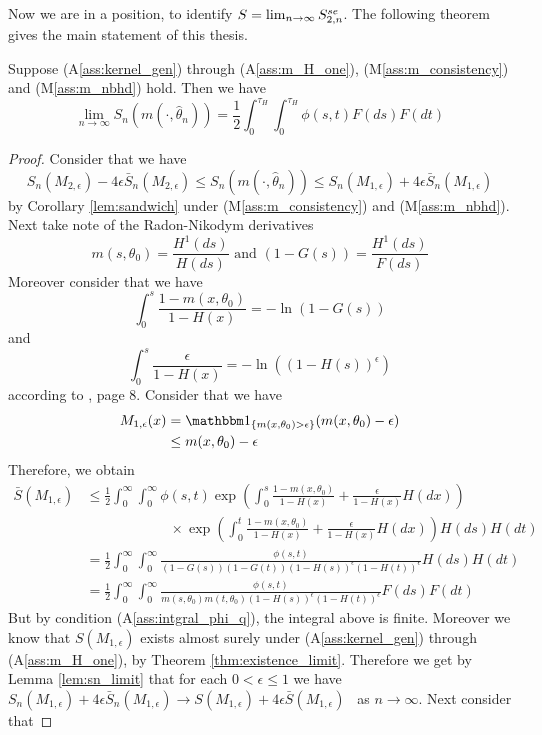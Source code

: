 Now we are in a position, to identify $S = \lim_{n\to\infty} S_{2,n}^{se}$. The following theorem gives the main statement of this thesis.
\begin{thm}
	Suppose (A\ref{ass:kernel_gen}) through (A\ref{ass:m_H_one}), (M\ref{ass:m_consistency}) and (M\ref{ass:m_nbhd}) hold. Then we have
	$$\lim\limits_{n\to\infty} S_n(m(\cdot, \hat{\theta}_n)) = \frac{1}{2}\int_{0}^{\tau_H}\int_{0}^{\tau_H} \phi(s,t) F(ds)F(dt)$$
	\label{thm:snmn_limit}
	\begin{proof}
		Consider that we have
		$$S_n(M_{2,\epsilon}) - 4\epsilon \bar{S}_n(M_{2,\epsilon}) \leq S_n(m(\cdot, \hat\theta_n)) \leq S_n(M_{1,\epsilon}) + 4\epsilon \bar{S}_n(M_{1,\epsilon})$$
		by Corollary \ref{lem:sandwich} under (M\ref{ass:m_consistency}) and (M\ref{ass:m_nbhd}). Next take note of the Radon-Nikodym derivatives 
		$$m(s,\theta_0) = \frac{H^1(ds)}{H(ds)} \textrm{ and } (1-G(s)) = \frac{H^1(ds)}{F(ds)}$$
		Moreover consider that we have
		$$\int_{0}^{s} \frac{1-m(x,\theta_0)}{1-H(x)} = -\ln(1-G(s))$$
		and 
		$$\int_{0}^{s} \frac{\epsilon}{1-H(x)} = -\ln((1-H(s))^\epsilon)$$
		according to \cite{dikta2000strong}, page 8.
		Consider that we have 
		\begin{align*}
			M_{1,\epsilon}(x) &= \I{ m(x,\theta_0)>\epsilon}(m(x,\theta_0)-\epsilon)\\
			&\leq m(x,\theta_0)-\epsilon
		\end{align*}
		Therefore, we obtain
		\begin{align*}
			\bar{S}(M_{1,\epsilon}) &\leq \frac{1}{2}\int_{0}^{\infty} \int_{0}^{\infty} \phi(s,t)  \exp\left(\int_{0}^{s} \frac{1-m(x,\theta_0)}{1-H(x)} + \frac{\epsilon}{1-H(x)} H(dx)\right)\\
			&\qquad\qquad\qquad \times \exp\left(\int_{0}^{t} \frac{1-m(x,\theta_0)}{1-H(x)} + \frac{\epsilon}{1-H(x)} H(dx) \right)H(ds)H(dt)\\
			&= \frac{1}{2}\int_{0}^{\infty} \int_{0}^{\infty} \frac{\phi(s,t)}{(1-G(s))(1-G(t))(1-H(s))^\epsilon(1-H(t))^\epsilon} H(ds)H(dt)\\
			&= \frac{1}{2}\int_{0}^{\infty} \int_{0}^{\infty} \frac{\phi(s,t)}{m(s,\theta_0)m(t,\theta_0)(1-H(s))^\epsilon(1-H(t))^\epsilon} F(ds)F(dt)
		\end{align*}
		But by condition (A\ref{ass:intgral_phi_q}), the integral above is finite. Moreover we know that $S(M_{1,\epsilon})$ exists almost surely under (A\ref{ass:kernel_gen}) through (A\ref{ass:m_H_one}), by Theorem \ref{thm:existence_limit}. Therefore we get by Lemma \ref{lem:sn_limit} that for each $0<\epsilon\leq1$ we have $S_n(M_{1,\epsilon}) + 4\epsilon \bar{S}_n(M_{1,\epsilon}) \to S(M_{1,\epsilon}) + 4\epsilon \bar{S}(M_{1,\epsilon})$ \wpo\ as $n\to\infty$. Next consider that 

\end{proof}
\end{thm}
